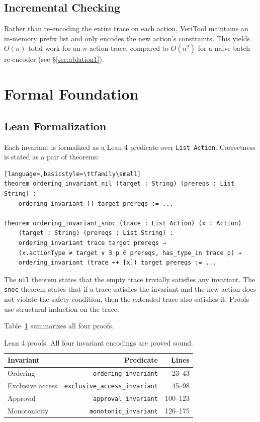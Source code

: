 \documentclass[10pt,twocolumn]{article}
\begin{document}
\subsection{Incremental Checking}

Rather than re-encoding the entire trace on each action, VeriTool
maintains an in-memory prefix list and only encodes the new action's
constraints. This yields $O(n)$ total work for an $n$-action trace,
compared to $O(n^2)$ for a naive batch re-encoder
(see \S\ref{sec:ablation1}).

\section{Formal Foundation}
\label{sec:foundation}

\subsection{Lean Formalization}

Each invariant is formalized as a Lean 4 predicate over \texttt{List Action}.
Correctness is stated as a pair of theorems:

\begin{lstlisting}[language=,basicstyle=\ttfamily\small]
theorem ordering_invariant_nil (target : String) (prereqs : List String) :
    ordering_invariant [] target prereqs := ...

theorem ordering_invariant_snoc (trace : List Action) (x : Action)
    (target : String) (prereqs : List String) :
    ordering_invariant trace target prereqs →
    (x.actionType ≠ target ∨ ∃ p ∈ prereqs, has_type_in trace p) →
    ordering_invariant (trace ++ [x]) target prereqs := ...
\end{lstlisting}

The \texttt{nil} theorem states that the empty trace trivially satisfies
any invariant. The \texttt{snoc} theorem states that if a trace satisfies
the invariant and the new action does not violate the safety condition,
then the extended trace also satisfies it. Proofs use structural induction
on the trace.

Table~\ref{tab:lean-proofs} summarizes all four proofs.

\begin{table}[t]
\centering
\caption{Lean 4 proofs. All four invariant encodings are proved sound.}
\label{tab:lean-proofs}
\begin{tabular}{lrr}
\toprule
Invariant & Predicate & Lines \\
\midrule
Ordering & \texttt{ordering\_invariant} & 23--43 \\
Exclusive access & \texttt{exclusive\_access\_invariant} & 45--98 \\
Approval & \texttt{approval\_invariant} & 100--123 \\
Monotonicity & \texttt{monotonic\_invariant} & 126--175 \\
\bottomrule
\end{tabular}
\end{table}
\end{document}

